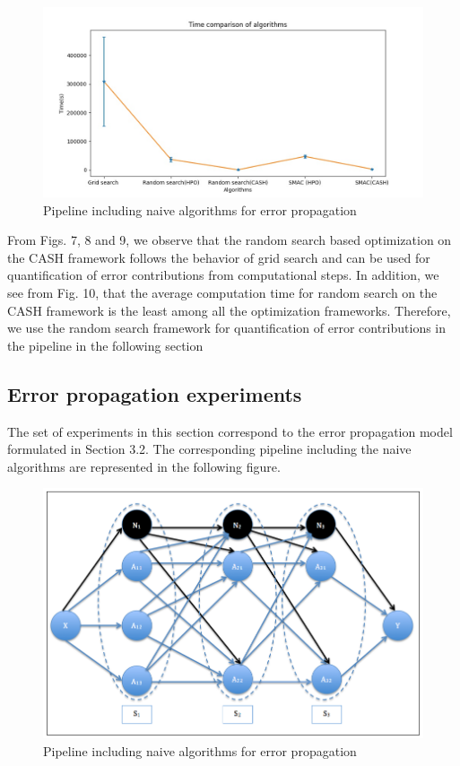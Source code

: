 \begin{figure}[H]
    \centering
    \includegraphics[scale=0.45]{img/EP/times_algorithms}
    \caption{Pipeline including naive algorithms for error propagation}
    \label{fig:flowchart}
\end{figure}

From Figs. 7, 8 and 9, we observe that the random search based optimization on the CASH framework follows the behavior of grid search and can be used for quantification of error contributions from computational steps. In addition, we see from Fig. 10, that the average computation time for random search on the CASH framework is the least among all the optimization frameworks. Therefore, we use the random search framework for quantification of error contributions in the pipeline in the following section


\subsection{Error propagation experiments}
The set of experiments in this section correspond to the error propagation model formulated in Section 3.2. The corresponding pipeline including the naive algorithms are represented in the following figure.

\begin{figure}[H]
    \centering
    \includegraphics[scale=0.5]{img/EP/naive}
    \caption{Pipeline including naive algorithms for error propagation}
    \label{fig:flowchart}
\end{figure}

